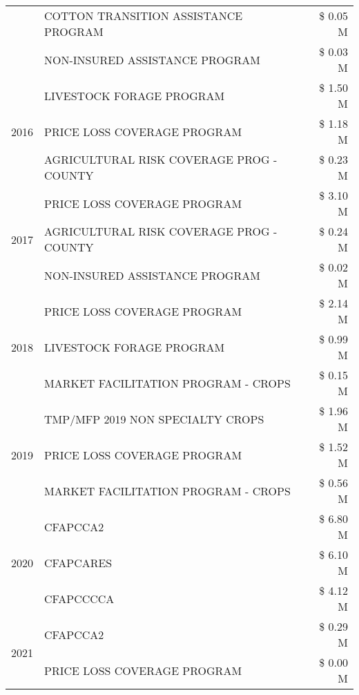 \begin{tabular}{llr}
 & COTTON TRANSITION ASSISTANCE PROGRAM & \$ 0.05 M \\
 & NON-INSURED ASSISTANCE PROGRAM & \$ 0.03 M \\
\cline{1-3}
\multirow[t]{3}{*}{2016} & LIVESTOCK FORAGE PROGRAM & \$ 1.50 M \\
 & PRICE LOSS COVERAGE PROGRAM & \$ 1.18 M \\
 & AGRICULTURAL RISK COVERAGE PROG - COUNTY & \$ 0.23 M \\
\cline{1-3}
\multirow[t]{3}{*}{2017} & PRICE LOSS COVERAGE PROGRAM & \$ 3.10 M \\
 & AGRICULTURAL RISK COVERAGE PROG - COUNTY & \$ 0.24 M \\
 & NON-INSURED ASSISTANCE PROGRAM & \$ 0.02 M \\
\cline{1-3}
\multirow[t]{3}{*}{2018} & PRICE LOSS COVERAGE PROGRAM & \$ 2.14 M \\
 & LIVESTOCK FORAGE PROGRAM & \$ 0.99 M \\
 & MARKET FACILITATION PROGRAM - CROPS & \$ 0.15 M \\
\cline{1-3}
\multirow[t]{3}{*}{2019} & TMP/MFP 2019 NON SPECIALTY CROPS & \$ 1.96 M \\
 & PRICE LOSS COVERAGE PROGRAM & \$ 1.52 M \\
 & MARKET FACILITATION PROGRAM - CROPS & \$ 0.56 M \\
\cline{1-3}
\multirow[t]{3}{*}{2020} & CFAPCCA2 & \$ 6.80 M \\
 & CFAPCARES & \$ 6.10 M \\
 & CFAPCCCCA & \$ 4.12 M \\
\cline{1-3}
\multirow[t]{2}{*}{2021} & CFAPCCA2 & \$ 0.29 M \\
 & PRICE LOSS COVERAGE PROGRAM & \$ 0.00 M \\
\cline{1-3}
\bottomrule
\end{tabular}
